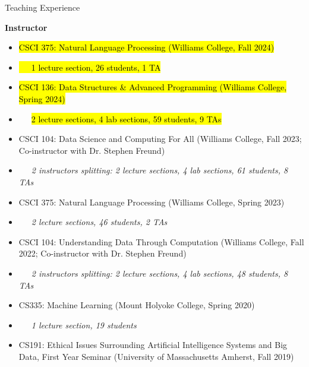 \documentclass{resume} %
\begin{document}

\begin{rSection}{Teaching Experience}

\textbf{Instructor}

\begin{itemize}
    \item \hl{CSCI 375: Natural Language Processing (Williams College, Fall 2024)}
    \item[] \hl{~~~1 lecture section, 26 students, 1 TA}

    \item \hl{CSCI 136: Data Structures \& Advanced Programming (Williams College, Spring 2024)}
    \item[] ~~~\hl{2 lecture sections, 4 lab sections, 59 students, 9 TAs}

    \item CSCI 104: Data Science and Computing For All (Williams College, Fall 2023; Co-instructor with Dr. Stephen Freund)
    \item[] ~~~\emph{2 instructors splitting: 2 lecture sections, 4 lab sections, 61 students, 8 TAs}

    \item CSCI 375: Natural Language Processing (Williams College, Spring 2023)
    \item[] ~~~\emph{2 lecture sections, 46 students, 2 TAs}

    \item CSCI 104: Understanding Data Through Computation (Williams College, Fall 2022; Co-instructor with Dr. Stephen Freund)
    \item[] ~~~\emph{2 instructors splitting: 2 lecture sections, 4 lab sections, 48 students, 8 TAs}

    \item CS335: Machine Learning (Mount Holyoke College, Spring 2020)
    \item[] ~~~\emph{1 lecture section, 19 students}

    \item CS191: Ethical Issues Surrounding Artificial Intelligence Systems and Big Data, First Year Seminar (University of Massachusetts Amherst, Fall 2019)
\end{itemize}




\end{rSection}
\end{document}
